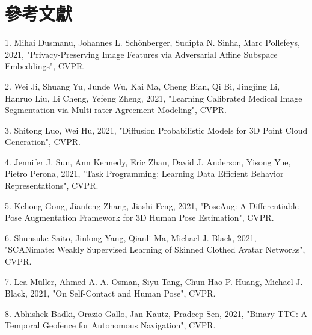 \documentclass[10pt,UTF8]{ctexart}
\begin{document}
\section{參考文獻}

1. Mihai Dusmanu, Johannes L. Schönberger, Sudipta N. Sinha, Marc Pollefeys, 2021, "Privacy-Preserving Image Features via Adversarial Affine Subspace Embeddings", CVPR.

2. Wei Ji, Shuang Yu, Junde Wu, Kai Ma, Cheng Bian, Qi Bi, Jingjing Li, Hanruo Liu, Li Cheng, Yefeng Zheng, 2021, "Learning Calibrated Medical Image Segmentation via Multi-rater Agreement Modeling", CVPR.

3. Shitong Luo, Wei Hu, 2021, "Diffusion Probabilistic Models for 3D Point Cloud Generation", CVPR.

4. Jennifer J. Sun, Ann Kennedy, Eric Zhan, David J. Anderson, Yisong Yue, Pietro Perona, 2021, "Task Programming: Learning Data Efficient Behavior Representations", CVPR.

5. Kehong Gong, Jianfeng Zhang, Jiashi Feng, 2021, "PoseAug: A Differentiable Pose Augmentation Framework for 3D Human Pose Estimation", CVPR.

6. Shunsuke Saito, Jinlong Yang, Qianli Ma, Michael J. Black, 2021, "SCANimate: Weakly Supervised Learning of Skinned Clothed Avatar Networks", CVPR.

7. Lea Müller, Ahmed A. A. Osman, Siyu Tang, Chun-Hao P. Huang, Michael J. Black, 2021, "On Self-Contact and Human Pose", CVPR.

8. Abhishek Badki, Orazio Gallo, Jan Kautz, Pradeep Sen, 2021, "Binary TTC: A Temporal Geofence for Autonomous Navigation", CVPR.

\newpage








\clearpage
\end{document}

